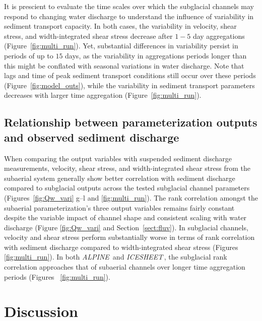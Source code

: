 \documentclass[11pt]{article}
\newcommand{\alpine}{\textit{ALPINE}\,}
\newcommand{\icesheet}{\textit{ICESHEET}\,}
\begin{document}
It is prescient to evaluate the time scales over which the subglacial channels may respond to changing water discharge to understand the influence of variability in sediment transport capacity.
In both cases, the variability in velocity, shear stress, and width-integrated shear stress decrease after $1-5$ day aggregations (Figure~\ref{fig:multi_run}).
Yet, substantial differences in variability persist in periods of up to $15$ days, as the variability in aggregations periods longer than this might be conflated with seasonal variations in water discharge.
Note that lags and time of peak sediment transport conditions still occur over these periods (Figure~\ref{fig:model_outs}), while the variability in sediment transport parameters decreases with larger time aggregation (Figure~\ref{fig:multi_run}).

\subsection{Relationship between parameterization  outputs and observed sediment discharge}
When comparing the output variables with suspended sediment discharge measurements, velocity, shear stress, and width-integrated shear stress from the subaerial system generally show better correlation with sediment discharge compared to subglacial outputs across the tested subglacial channel parameters (Figures~\ref{fig:Qw_vari} g--l and \ref{fig:multi_run}).
The rank correlation amongst the  subaerial parameterization's three output variables remains fairly constant despite the variable impact of channel shape and consistent scaling with water discharge (Figure \ref{fig:Qw_vari} and Section~\ref{sect:fluv}).
In subglacial channels, velocity and shear stress perform substantially worse in terms of rank correlation with sediment discharge compared to width-integrated shear stress (Figures~ \ref{fig:multi_run}).
In both \alpine{} and \icesheet{}, the  subglacial rank correlation approaches that of subaerial channels over longer time aggregation periods (Figures~ \ref{fig:multi_run}).


\section{Discussion}
\end{document}

